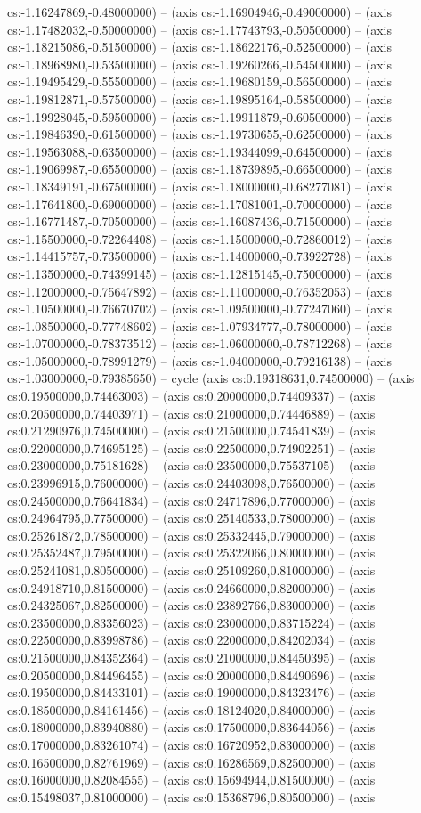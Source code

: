cs:-1.16247869,-0.48000000) -- (axis cs:-1.16904946,-0.49000000) -- (axis cs:-1.17482032,-0.50000000) -- (axis cs:-1.17743793,-0.50500000) -- (axis cs:-1.18215086,-0.51500000) -- (axis cs:-1.18622176,-0.52500000) -- (axis cs:-1.18968980,-0.53500000) -- (axis cs:-1.19260266,-0.54500000) -- (axis cs:-1.19495429,-0.55500000) -- (axis cs:-1.19680159,-0.56500000) -- (axis cs:-1.19812871,-0.57500000) -- (axis cs:-1.19895164,-0.58500000) -- (axis cs:-1.19928045,-0.59500000) -- (axis cs:-1.19911879,-0.60500000) -- (axis cs:-1.19846390,-0.61500000) -- (axis cs:-1.19730655,-0.62500000) -- (axis cs:-1.19563088,-0.63500000) -- (axis cs:-1.19344099,-0.64500000) -- (axis cs:-1.19069987,-0.65500000) -- (axis cs:-1.18739895,-0.66500000) -- (axis cs:-1.18349191,-0.67500000) -- (axis cs:-1.18000000,-0.68277081) -- (axis cs:-1.17641800,-0.69000000) -- (axis cs:-1.17081001,-0.70000000) -- (axis cs:-1.16771487,-0.70500000) -- (axis cs:-1.16087436,-0.71500000) -- (axis cs:-1.15500000,-0.72264408) -- (axis cs:-1.15000000,-0.72860012) -- (axis cs:-1.14415757,-0.73500000) -- (axis cs:-1.14000000,-0.73922728) -- (axis cs:-1.13500000,-0.74399145) -- (axis cs:-1.12815145,-0.75000000) -- (axis cs:-1.12000000,-0.75647892) -- (axis cs:-1.11000000,-0.76352053) -- (axis cs:-1.10500000,-0.76670702) -- (axis cs:-1.09500000,-0.77247060) -- (axis cs:-1.08500000,-0.77748602) -- (axis cs:-1.07934777,-0.78000000) -- (axis cs:-1.07000000,-0.78373512) -- (axis cs:-1.06000000,-0.78712268) -- (axis cs:-1.05000000,-0.78991279) -- (axis cs:-1.04000000,-0.79216138) -- (axis cs:-1.03000000,-0.79385650) -- cycle (axis cs:0.19318631,0.74500000) -- (axis cs:0.19500000,0.74463003) -- (axis cs:0.20000000,0.74409337) -- (axis cs:0.20500000,0.74403971) -- (axis cs:0.21000000,0.74446889) -- (axis cs:0.21290976,0.74500000) -- (axis cs:0.21500000,0.74541839) -- (axis cs:0.22000000,0.74695125) -- (axis cs:0.22500000,0.74902251) -- (axis cs:0.23000000,0.75181628) -- (axis cs:0.23500000,0.75537105) -- (axis cs:0.23996915,0.76000000) -- (axis cs:0.24403098,0.76500000) -- (axis cs:0.24500000,0.76641834) -- (axis cs:0.24717896,0.77000000) -- (axis cs:0.24964795,0.77500000) -- (axis cs:0.25140533,0.78000000) -- (axis cs:0.25261872,0.78500000) -- (axis cs:0.25332445,0.79000000) -- (axis cs:0.25352487,0.79500000) -- (axis cs:0.25322066,0.80000000) -- (axis cs:0.25241081,0.80500000) -- (axis cs:0.25109260,0.81000000) -- (axis cs:0.24918710,0.81500000) -- (axis cs:0.24660000,0.82000000) -- (axis cs:0.24325067,0.82500000) -- (axis cs:0.23892766,0.83000000) -- (axis cs:0.23500000,0.83356023) -- (axis cs:0.23000000,0.83715224) -- (axis cs:0.22500000,0.83998786) -- (axis cs:0.22000000,0.84202034) -- (axis cs:0.21500000,0.84352364) -- (axis cs:0.21000000,0.84450395) -- (axis cs:0.20500000,0.84496455) -- (axis cs:0.20000000,0.84490696) -- (axis cs:0.19500000,0.84433101) -- (axis cs:0.19000000,0.84323476) -- (axis cs:0.18500000,0.84161456) -- (axis cs:0.18124020,0.84000000) -- (axis cs:0.18000000,0.83940880) -- (axis cs:0.17500000,0.83644056) -- (axis cs:0.17000000,0.83261074) -- (axis cs:0.16720952,0.83000000) -- (axis cs:0.16500000,0.82761969) -- (axis cs:0.16286569,0.82500000) -- (axis cs:0.16000000,0.82084555) -- (axis cs:0.15694944,0.81500000) -- (axis cs:0.15498037,0.81000000) -- (axis cs:0.15368796,0.80500000) -- (axis 
